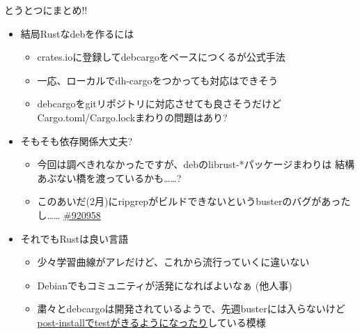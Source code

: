 \documentclass[cjk,dvipdfmx,10pt,compress,fragile%
hyperref={bookmarks=true,bookmarksnumbered=true,bookmarksopen=false,%
colorlinks=false,%
pdftitle={第 134 回 関西 Debian 勉強会},%
pdfauthor={小林},%
pdfsubject={資料},%
}]{beamer}
\begin{document}
\begin{frame}[t,fragile]{とうとつにまとめ!!}
\begin{itemize}
 \item 結局Rustなdebを作るには
       \begin{itemize}
	\item crates.ioに登録してdebcargoをベースにつくるが公式手法
	\item 一応、ローカルでdh-cargoをつかっても対応はできそう
	\item debcargoをgitリポジトリに対応させても良さそうだけど
	      Cargo.toml/Cargo.lockまわりの問題はあり?
       \end{itemize}
 \item そもそも依存関係大丈夫?
       \begin{itemize}
	\item 今回は調べきれなかったですが、debのlibrust-*パッケージまわりは
	      結構あぶない橋を渡っているかも……?
	\item このあいだ(2月)にripgrepがビルドできないというbusterのバグがあったし……
	      \href{https://bugs.debian.org/cgi-bin/bugreport.cgi?bug=920958}{\#920958}
       \end{itemize}
 \item それでもRustは良い言語
       \begin{itemize}
	\item 少々学習曲線がアレだけど、これから流行っていくに違いない
	\item Debianでもコミュニティが活発になればよいなぁ (他人事)
	\item 粛々とdebcargoは開発されているようで、先週busterには入らないけど
	      \href{https://alioth-lists.debian.net/pipermail/pkg-rust-maintainers/2019-March/005296.html}
	      {post-installでtestがきるようになったり}している模様
       \end{itemize}
\end{itemize}
\end{frame}

\end{document}
